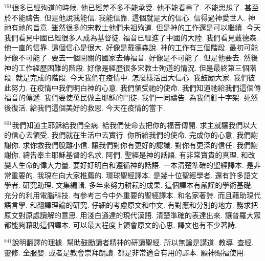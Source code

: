 \documentclass{book}
\begin{document}
$^{761}$很多已經殉道的時候.
他已經差不多不能承受.
他不能看書了.
不能思想了.
甚至於不能禱告.
但是他說我能信.
我能信靠.
這個就是大的信心.
信得過神愛世人.
神祂有祂的旨意.
雖然很多的宋教士他們未祖殉道.
但是神的工作還是可以繼續.
今天我們看見中國已經很多人成為基督徒.
福音已經進了中國的大陸.
我們看見戴德森.
他一直的信靠.
這個信心是很大.
好像是戴德森說.
神的工作有三個階段.
最初可能好像不可能了.
要去一個閉關的國家去傳福音.
好像是不可能了.
但是他要去.
然後神的工作經歷困難的階段.
好像是經歷很多宋教士殉道的情況.
但是最終第三個階段.
就是完成的階段.
今天我們在疫情中.
怎麼樣活出大信心.
我鼓勵大家.
我們彼此努力.
在疫情中我們明白神的心意.
我們領受祂的使命.
我們知道祂給我們這個傳福音的傳遞.
我們要使萬民做主耶穌的門徒.
我們一同禱告.
為我們釘十字架.
死然後復活.
給我們這個美好的救恩.
今天在疫情的當下.

$^{801}$我們知道主耶穌給我們全病.
給我們使命去把你的福音傳開.
求主就讓我們以大的信心去領受.
我們就在生活中去實行.
你所給我們的使命.
完成你的心意.
我們謝謝你.
求你救我們脫離小信.
讓我們對你有更好的認識.
對你有更深的信任.
我們謝謝你.
禱告奉主耶穌基督的名求.
阿們.
聖經是神的話語.
有非常寶貴的真理.
和改變人生命的偉大力量.
要好好明白和遵循神的話語.
一本清楚準確的聖經譯本.
是非常重要的.
我現在向大家推薦的.
環球聖經譯本.
是幾十位聖經學者.
還有許多語文學者.
研究助理.
文集編輯.
多年來努力耕耘的成果.
這個譯本有嚴謹的學術基礎.
充分的利用電腦科技.
有參考古今中外重要的聖經譯本.
和名家著詩.
而且藉助現代語言學.
和翻譯理論的研究.
仔細的考慮原文和中文.
有對應和分別的地方.
務求把原文對原處讀解的意思.
用淺白通達的現代漢語.
清楚準確的表達出來.
讓普羅大眾都能夠藉助這個譯本.
可以最大程度上領會原文的心思.
譯文也有不少著詩.

$^{841}$說明翻譯的理據.
幫助鼓勵讀者精神的研讀聖經.
所以無論是講道.
教導.
查經.
靈修.
全服嬰.
或者是教會崇拜朗讀.
都是非常適合有用的譯本.
願神賜福使用.
\newpage
\end{document}
